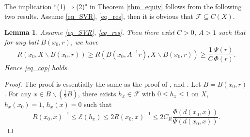 \documentclass[11pt,a4paper]{article}
\numberwithin{equation}{section}
\theoremstyle{plain}
\newtheorem{lemma}[theorem]{Lemma}
\theoremstyle{definition}
\begin{document}
The implication ``(1)$\Rightarrow$(2)" in Theorem \ref{thm_equiv} follows from the following two results. Assume \ref{eq_SVR}, \ref{eq_res}, then it is obvious that $\mathcal{F}\subseteq C(X)$.

\begin{lemma}\label{lem_R2cap}
Assume \ref{eq_SVR}, \ref{eq_res}. Then there exist $C>0$, $A>1$ such that for any ball $B(x_0,r)$, we have
$$R(x_0,X\backslash B(x_0,r))\ge R(B(x_0,A^{-1}r),X\backslash B(x_0,r))\ge \frac{1}{C} \frac{\Psi(r)}{\Phi(r)}.$$
Hence \ref{eq_cap} holds.
\end{lemma}

\begin{proof}
The proof is essentially the same as the proof of \cite[LEMMA 2.4]{BCK05}, \cite[Lemma 4.1]{Kum04} and \cite[Proposition 5.3]{Hu08}. Let $B=B(x_0,r)$. For any $x\in B\backslash(\frac{1}{2}B)$, there exists $h_x\in\mathcal{F}$ with $0\le h_x\le 1$ on $X$, $h_x(x_0)=1$, $h_x(x)=0$ such that
$$R(x_0,x)^{-1}\le\mathcal{E}(h_x)\le2R(x_0,x)^{-1}\le 2C_R \frac{\Phi(d(x_0,x))}{\Psi(d(x_0,x))}.$$


\end{proof}
\end{document}
